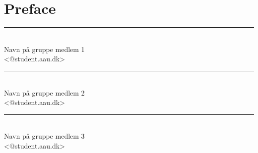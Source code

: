 \chapter*{Preface}

\lipsum[5]




\vspace{3\baselineskip}\hfill 
\vfill\noindent
\begin{minipage}[b]{0.45\textwidth}
 \centering
 \rule{\textwidth}{0.5pt}\\
  Navn på gruppe medlem 1\\
 {\footnotesize <@student.aau.dk>}
\end{minipage}
\hfill
\begin{minipage}[b]{0.45\textwidth}
 \centering
 \rule{\textwidth}{0.5pt}\\
  Navn på gruppe medlem 2\\
 {\footnotesize <@student.aau.dk>}
\end{minipage}
\vspace{3\baselineskip}

\begin{center}
\begin{minipage}[b]{0.45\textwidth}
 \centering
 \rule{\textwidth}{0.5pt}\\
  Navn på gruppe medlem 3\\
 {\footnotesize <@student.aau.dk>}
\end{minipage}
\end{center}

